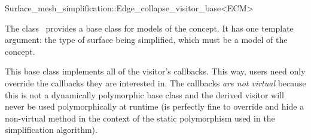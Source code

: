 
\begin{ccRefClass}{Surface_mesh_simplification::Edge_collapse_visitor_base<ECM>}


\ccDefinition

The class \ccRefName\ provides a base class for models of the  concept.
It has one template argument: the type of surface being simplified,
which must be a model of the  concept.

This base class implements all of the visitor's callbacks. 
This way, users need only override the callbacks they are interested in.
The callbacks {\em are not virtual} because this is not a dynamically polymorphic base class
and the derived visitor will never be used polymorphically at runtime (is perfectly fine to override 
and hide a non-virtual method in the context of the static polymorphism used in the simplification algorithm).


\ccIsModel
{}

  
\end{ccRefClass}

